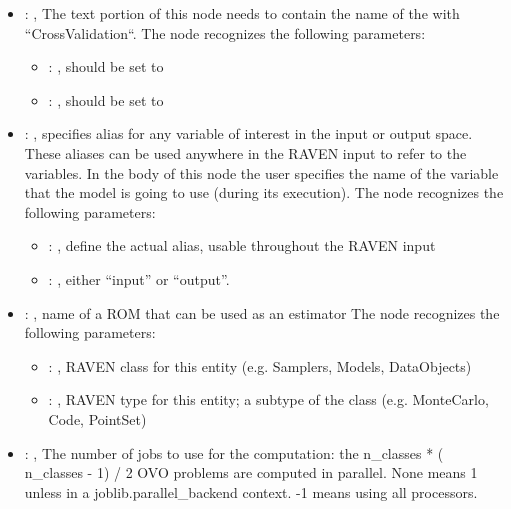 \begin{itemize}
    \item {}: , 
      The text portion of this node needs to contain the name of the  with
               ``CrossValidation``.
      The  node recognizes the following parameters:
        \begin{itemize}
          \item {}: , 
            should be set to 
          \item {}: , 
            should be set to 
      \end{itemize}

    \item {}: , 
      specifies alias for         any variable of interest in the input or output space. These
      aliases can be used anywhere in the RAVEN input to         refer to the variables. In the body
      of this node the user specifies the name of the variable that the model is going to use
      (during its execution).
      The  node recognizes the following parameters:
        \begin{itemize}
          \item {}: , 
            define the actual alias, usable throughout the RAVEN input
          \item {}: , 
            either ``input'' or ``output''.
      \end{itemize}

    \item {}: , 
      name of a ROM that can be used as an estimator
      The  node recognizes the following parameters:
        \begin{itemize}
          \item {}: , 
            RAVEN class for this entity (e.g. Samplers, Models, DataObjects)
          \item {}: , 
            RAVEN type for this entity; a subtype of the class (e.g. MonteCarlo, Code, PointSet)
      \end{itemize}

    \item {}: , 
      The number of jobs to use for the computation: the n\_classes * ( n\_classes - 1) / 2 OVO
      problems are computed in parallel. None means 1 unless in a joblib.parallel\_backend
      context. -1 means using all processors.
  \end{itemize}


